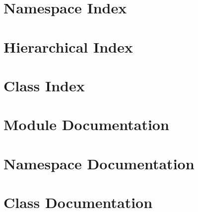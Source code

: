 \documentclass[twoside]{book}
\newcommand{\+}{\discretionary{\mbox{\scriptsize$\hookleftarrow$}}{}{}}
\newcommand{\clearemptydoublepage}{%
  \newpage{\pagestyle{empty}\cleardoublepage}%
}
\begin{document}
\chapter{Namespace Index}

\chapter{Hierarchical Index}

\chapter{Class Index}

\chapter{Module Documentation}






\chapter{Namespace Documentation}


\chapter{Class Documentation}


































\backmatter
\newpage
{}
\clearemptydoublepage
{}
\printindex
\end{document}
